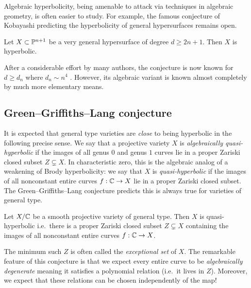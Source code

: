 \documentclass[main.tex]{subfiles}
\begin{document}
Algebraic hyperbolicity, being amenable to attack via techniques in algebraic geometry, is often easier to study. For example, the famous conjecture of Kobayashi predicting the hyperbolicity of general hypersurfaces remains open.

\begin{conj}[Kobayashi]
Let $X \subset \P^{n+1}$ be a very general hypersurface of degree $d \ge 2n + 1$. Then $X$ is hyperbolic.
\end{conj}

After a considerable effort by many authors, the conjecture is now known for $d \ge d_n$ where $d_n \sim n^4$ \cite{kirwan:nonRedGIT_hyperbolicity}. However, its algebraic variant is known almost completely \cite{voisin:clemens_rational_curves, coskun_riedl_hyperbolicity_quintic_surface, yeong:hyperbolicity_hypersurfaces} by much more elementary means.  

\subsection{Green--Griffiths--Lang conjecture}

It is expected that general type varieties are \textit{close} to being hyperbolic in the following precise sense. We say that a projective variety $X$ is \textit{algebraically quasi-hyperbolic} if the images of all genus $0$ and genus $1$ curves lie in a proper Zariski closed subset $Z \subsetneq X$. In characteristic zero, this is the algebraic analog of a weakening of Brody hyperbolicity: we say that $X$ is \textit{quasi-hyperbolic} if the images of all nonconstant entire curves $f : \CC \to X$ lie in a proper Zariski closed subset. The Green--Griffiths--Lang conjecture predicts this is always true for varieties of general type.

\begin{conj}
Let $X / \CC$ be a smooth projective variety of general type. Then $X$ is quasi-hyperbolic i.e.\ there is a proper Zariski closed subset $Z \subsetneq X$ containing the images of all nonconstant entire curves $f : \CC \to X$.
\end{conj}

The minimum such $Z$ is often called the \textit{exceptional set} of $X$. The remarkable feature of this conjecture is that we expect every entire curve to be \textit{algebraically degenerate} meaning it satisfies a polynomial relation (i.e.\ it lives in $Z$). Moreover, we expect that these relations can be chosen independently of the map! 
\end{document}
